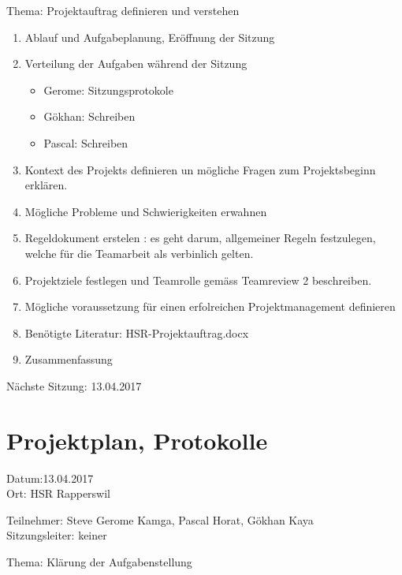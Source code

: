 Thema: Projektauftrag definieren und verstehen
\begin{enumerate}

\item Ablauf und Aufgabeplanung, Eröffnung der Sitzung 

\item  Verteilung der Aufgaben während der Sitzung
\begin{itemize}
\item Gerome: Sitzungsprotokole
\item Gökhan: Schreiben
\item Pascal: Schreiben 
\end{itemize}

\item Kontext des Projekts definieren un mögliche Fragen zum Projektsbeginn erklären.

\item Mögliche Probleme und Schwierigkeiten erwahnen

\item Regeldokument erstelen : es geht darum, allgemeiner Regeln festzulegen, welche für die Teamarbeit als verbinlich gelten.

\item Projektziele festlegen und Teamrolle gemäss Teamreview 2 beschreiben.

\item Mögliche voraussetzung für einen erfolreichen Projektmanagement definieren

\item Benötigte Literatur: HSR-Projektauftrag.docx   

\item Zusammenfassung

\end{enumerate}

Nächste Sitzung: 13.04.2017




\newpage

\section*{Projektplan, Protokolle}

Datum:13.04.2017\\
Ort: HSR Rapperswil

Teilnehmer: Steve Gerome Kamga, Pascal Horat, Gökhan Kaya\\
Sitzungsleiter: keiner

Thema: Klärung der Aufgabenstellung


